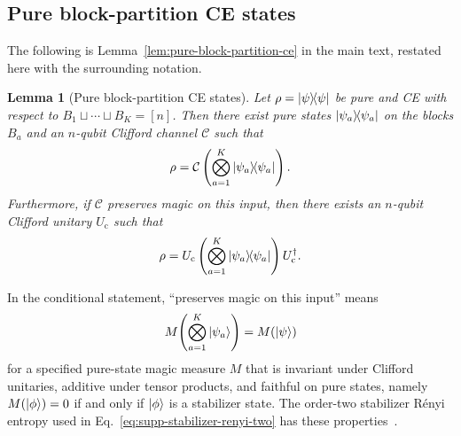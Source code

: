 \documentclass[
  aps,
  prx,
  reprint,
  superscriptaddress,
  amsmath,
  amssymb,
  nofootinbib,
  longbibliography
]{revtex4-2}
\newtheorem{lemma}[theorem]{Lemma}
\newcommand{\map}[1]{\mathcal{#1}}
\begin{document}
\subsection{Pure block-partition CE states}
\label{sec:supp-pure-ce}

The following is Lemma~\ref{lem:pure-block-partition-ce} in the main text,
restated here with the surrounding notation.
\begin{lemma}[Pure block-partition CE states]
\label{lem:supp-pure-block-partition-ce}
Let $\rho=\dyad{\psi}$ be pure and CE with respect to
$B_1\sqcup\cdots\sqcup B_K=[n]$.  Then there exist pure states
$\dyad{\psi_a}$ on the blocks $B_a$ and an $n$-qubit Clifford channel
$\map C$ such that
\begin{equation}
\rho
=
\map C
\left(
\bigotimes_{a=1}^{K}\dyad{\psi_a}
\right).
\end{equation}
Furthermore, if $\map C$ preserves magic on this input, then there
exists an $n$-qubit Clifford unitary $U_{\mathrm c}$ such that
\begin{equation}
\rho
=
U_{\mathrm c}
\left(
\bigotimes_{a=1}^{K}\dyad{\psi_a}
\right)
U_{\mathrm c}^{\dagger}.
\end{equation}
\end{lemma}

In the conditional statement, ``preserves magic on this input'' means
\begin{equation}
M\!\left(\bigotimes_{a=1}^{K}\ket{\psi_a}\right)=M(\ket{\psi})
\label{eq:supp-magic-preservation-selected-input}
\end{equation}
for a specified pure-state magic measure $M$ that is invariant under Clifford
unitaries, additive under tensor products, and faithful on pure states, namely
$M(\ket{\phi})=0$ if and only if $\ket{\phi}$ is a stabilizer state.  The
order-two stabilizer R\'enyi entropy used in
Eq.~\eqref{eq:supp-stabilizer-renyi-two} has these
properties~\cite{LeoneOlivieroHamma2022SRE}.
\end{document}
